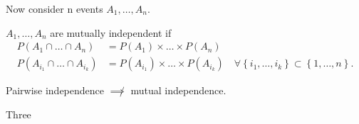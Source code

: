 Now consider n events $A_1, \ldots, A_n$.

\begin{definition}
	$A_1, \ldots, A_{n}$ are mutually independent if 
	\begin{align*}
		P\left( A_1\cap \ldots \cap A_{n} \right) &= P\left( A_1 \right) \times \ldots \times P\left( A_{n} \right) \\
	P\left( A_{i_{1}}\cap \ldots\cap A_{i_{k}}\right)  &= P\left( A_{i_1} \right) \times  \ldots \times  P\left( A_{i_{k}} \right) \quad \forall \left\{i_1,\ldots, i_{k} \right\} \subset  \left\{ 1, \ldots, n \right\} 
	.\end{align*}
\end{definition}
\begin{remark}
	Pairwise independence $\not\implies$  mutual independence. 
	\begin{example}
		Three 
	\end{example}
\end{remark}
